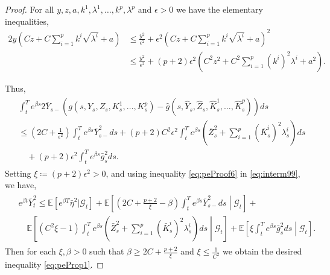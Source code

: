 \documentclass[10pt,a4paper]{amsart}
\begin{document}
\begin{proof}
    For all $y,z, a, k^1,\lambda^1,\ldots,k^p,\lambda^p$ and $\epsilon>0$ we have the elementary inequalities,
    \begin{align*}
        2y\left(Cz + C\sum_{i=1}^pk^i\sqrt{\lambda^i} + a\right) &\le \frac{y^2}{\epsilon^2} + \epsilon^2\left(Cz+C\sum_{i=1}^pk^i\sqrt{\lambda^i} +a\right)^2\\
        &\le \frac{y^2}{\epsilon^2} + (p+2)\epsilon^2\left(C^2z^2 + C^2\sum_{i=1}^p(k^i)^2\lambda^i + a^2\right).
    \end{align*}

    Thus,
    \begin{align}\label{eq:peProof6}
        \begin{aligned}
            &\int_t^T e^{\beta s}2\bar{Y}_{s-}(g(s,Y_s,Z_s,K_s^1,\ldots,K_s^p) - \hat{g}(s,\hat{Y}_s,\hat{Z}_s,\hat{K}_s^1,\ldots,\hat{K}_s^p))ds \\&\le \left(2C+\frac{1}{\epsilon^2}\right)\int_t^Te^{\beta s}\bar{Y}_{s-}^2ds + (p+2)C^2\epsilon^2\int_t^Te^{\beta s}\left(\bar{Z}_s^2 + \sum_{i=1}^p(\bar{K}_s^i)^2\lambda_s^i\right)ds  \\&\quad+(p+2)\epsilon^2\int_t^Te^{\beta s}\bar{g}_s^2ds.
        \end{aligned}
    \end{align}
    Setting $\xi\coloneqq(p+2)\epsilon^2>0$, and using inequality \eqref{eq:peProof6} in \eqref{eq:interm99}, we have,
    \begin{align}\label{eq:peProof7}
        \begin{aligned}
            &e^{\beta t}\bar{Y}_t^2 \le \mathbb{E}[e^{\beta T}\bar{\eta}^2|\mathcal{G}_t] + \mathbb{E}\left[\left(2C + \frac{p+2}{\xi} - \beta\right)\int_t^Te^{\beta s}\bar{Y}_{s-}^2ds\middle|\mathcal{G}_t\right] +\\
            &\quad\mathbb{E}\left[(C^2\xi-1)\int_t^Te^{\beta s}\left(\bar{Z}_s^2+\sum_{i=1}^p(\bar{K}_s^i)^2\lambda_s^i\right)ds\middle|\mathcal{G}_t\right] + \mathbb{E}\left[\xi\int_t^Te^{\beta s}\bar{g}_s^2ds\middle|\mathcal{G}_t\right].
        \end{aligned}
    \end{align}
    Then for each $\xi,\beta>0$ such that $\beta \ge 2C + \frac{p+2}{\xi}$ and $\xi\le\frac{1}{C^2}$ we obtain the desired inequality  \eqref{eq:peProp1}.
    


\end{proof}
\end{document}
